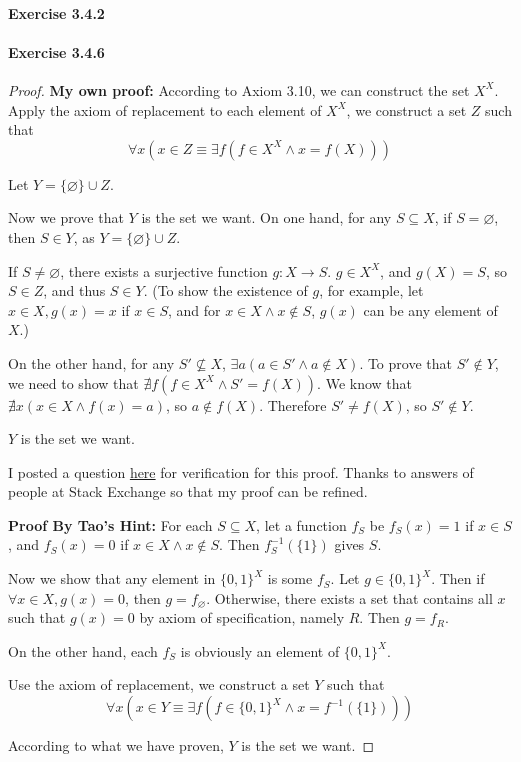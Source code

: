 \paragraph{Exercise 3.4.2} \label{exercise3.4.2}

\paragraph{Exercise 3.4.6} \label{exercise3.4.6}
\begin{proof}
\textbf{My own proof:} According to Axiom 3.10, we can construct the set $X^X$. Apply the axiom 
of replacement to each element of $X^X$, we construct a set $Z$ such that
\[
\forall x(x \in Z \equiv \exists f(f \in X^X \wedge x = f(X)))
\]

Let $Y = \{\varnothing\} \cup Z$.

Now we prove that $Y$ is the set we want. On one hand, for any $S \subseteq X$, 
if $S = \varnothing$, then $S \in Y$, as $Y = \{\varnothing\} \cup Z$.

If $S \neq \varnothing$, there exists a surjective function $g: X \rightarrow S$. $g\in X^X$, and 
$g(X) = S$, so $S \in Z$, and thus $S \in Y$. (To show the existence of $g$, for example, let $x \in X, 
g(x) = x$ if $x \in S$, and for $x \in X \wedge x \notin S$, $g(x)$ can be any element of $X$.)


On the other hand, for any $S' \nsubseteq X$, $\exists a(a \in S' \wedge a \notin X)$. To prove that 
$S' \notin Y$, we need to show that $\nexists f(f \in X^X \wedge S' = f(X))$. We know that 
$\nexists x(x \in X \wedge f(x) = a)$, so $a \notin f(X)$. Therefore $S' \neq f(X)$, so $S' \notin Y$.

$Y$ is the set we want.

I posted a question \href{https://math.stackexchange.com/questions/3803487/is-this-proof-to-the-existence-of-a-set-that-contains-all-subsets-of-another-set}{here} for verification for this proof. 
Thanks to answers of people at Stack Exchange so that my proof can be refined.

\textbf{Proof By Tao's Hint:}
For each $S \subseteq X$, let a function $f_S$ be $f_S(x) = 1$ if $x \in S$, and $f_S(x)=0$ if 
$x \in X \wedge x \notin S$. Then $f^{-1}_S(\{1\})$ gives $S$. 

Now we show that any element in 
$\{0,1\}^X$ is some $f_S$. Let $g \in \{0,1\}^X$. Then if $\forall x \in X, g(x) = 0$, then 
$g = f_{\varnothing}$. Otherwise, there exists a set that contains all $x$ such that $g(x) = 0$ by 
axiom of specification, namely $R$. Then $g = f_R$.

On the other hand, each $f_S$ is obviously an element of $\{0,1\}^X$.

Use the axiom of replacement, we construct a set $Y$ such that
\[
\forall x (x \in Y \equiv \exists f(f \in \{0,1\}^X \wedge x = f^{-1}(\{1\})))
\]

According to what we have proven, $Y$ is the set we want.
\end{proof}